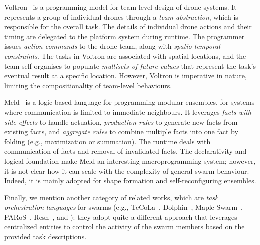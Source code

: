 Voltron~\cite{Mottola2014voltron} is a programming model for team-level design of drone systems. It represents a group of individual drones through a \emph{team abstraction}, 
 which is responsible for the overall task. 
 The details of individual drone actions and their timing are delegated to the platform system during runtime. 
 The programmer issues \emph{action commands} to the drone team, 
 along with \emph{spatio-temporal constraints}. 
 The tasks in Voltron are associated with spatial locations, 
 and the team self-organises to populate \emph{multisets of future values} that represent the task's eventual result at a specific location. 
%
However, Voltron is imperative in nature, limiting the compositionality of team-level behaviours.


Meld~\cite{Meld2007} is a logic-based language for programming modular ensembles,
for systems where communication is limited to immediate neighbours. 
%
It leverages 
\emph{facts with side-effects} to handle actuation, 
\emph{production rules} to generate new facts from existing facts, 
and \emph{aggregate rules} to combine multiple facts into one fact by folding (e.g., maximization or summation).
%
The runtime deals with communication of facts and removal of invalidated facts.
%
The declarativity and logical foundation 
 make Meld an interesting macroprogramming system;
 however, it is not clear how it can scale with the complexity of general swarm behaviour.
%
Indeed, it is mainly adopted for shape formation and self-reconfiguring ensembles.

Finally, we mention another category of related works, which are \emph{task orchestration languages} for swarms (e.g.,  TeCoLa~\cite{Koutsoubelias2016tecola},
 Dolphin~\cite{lima2018dolphin},
 Maple-Swarm~\cite{DBLP:conf/isola/KosakHBWHR20}, 
 PARoS~\cite{paros},
 Resh~\cite{DBLP:conf/icra/CarrollNS21}, 
 and \cite{DBLP:conf/iros/YiDLD0WY20}): they adopt quite a different approach that leverages centralized entities to control the activity of the swarm members based on the provided task descriptions.
%

